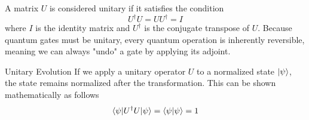 \documentclass[11pt, letterpaper]{article}
\begin{document}
A matrix $U$ is considered unitary if it satisfies the condition
\begin{equation}
  U^\dagger U = U U^\dagger = I
\end{equation}
where $I$ is the identity matrix and $U^\dagger$ is the conjugate transpose of $U$. Because quantum gates must be unitary, every quantum operation is inherently reversible, meaning we can always "undo" a gate by applying its adjoint.

\begin{SBUBox}{Unitary Evolution}
  If we apply a unitary operator $U$ to a normalized state $\ket{\psi}$, the state remains normalized after the transformation. This can be shown mathematically as follows
  \begin{equation*}
    \langle \psi | U^\dagger U | \psi \rangle = \braket{\psi|\psi} = 1
  \end{equation*}
\end{SBUBox}
\end{document}
